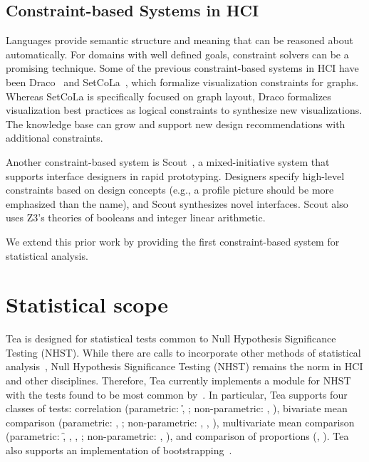 \subsection{Constraint-based Systems in HCI}
Languages provide semantic structure and meaning that can be reasoned about
automatically. For domains with well defined goals, constraint solvers can be a
promising technique. Some of the previous constraint-based systems in HCI have
been Draco~\cite{moritz2019formalizing} and SetCoLa~\cite{hoffswell2018setcola},
which formalize visualization constraints for graphs. Whereas SetCoLa is
specifically focused on graph layout, Draco formalizes visualization best
practices as logical constraints to synthesize new visualizations. The knowledge
base can grow and support new design recommendations with
additional constraints.


Another constraint-based system is Scout~\cite{swearngin2018scout}, a mixed-initiative system that supports
interface designers in rapid prototyping. Designers specify high-level 
constraints based on design concepts (e.g., a profile picture should be more
emphasized than the name), and Scout synthesizes novel interfaces. Scout also uses
Z3's theories of booleans and integer linear arithmetic. %

We extend this prior work by providing the first constraint-based system for statistical analysis. 


\section{Statistical scope}
Tea is designed for statistical tests common to Null Hypothesis Significance
Testing (NHST). While there are calls to incorporate other methods of
statistical analysis~\cite{kay2016researcher,kaptein2012rethinking}, Null
Hypothesis Significance Testing (NHST) remains the norm in HCI and other
disciplines. Therefore, Tea currently implements a module for NHST with the
tests found to be most common by~\cite{wacharamanotham2015statsplorer}. In
particular, Tea supports four classes of tests: correlation (parametric: \r,
\pb; non-parametric: \ktau, \srho), bivariate mean comparison (parametric:
\student, \paired; non-parametric: \mannu, \wilcox, \welch), multivariate mean
comparison (parametric: \f, \rm, \facANOVA, \twoANOVA; non-parametric: \kw,
\friedman), and comparison of proportions (\chiSq, \fisher). Tea also supports
an implementation of bootstrapping~\cite{efron1992bootstrap}.
